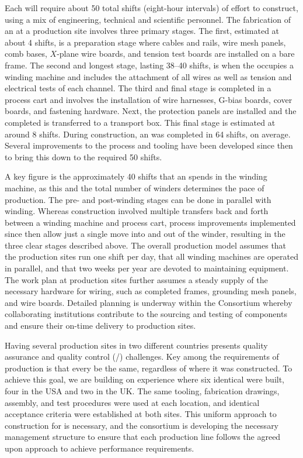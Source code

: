 Each  will require about \num{50} total shifts (eight-hour intervals) of effort to construct, using a mix of engineering, technical and scientific personnel.  The fabrication of an  at a production site involves three primary stages. The first, estimated at about \num{4} shifts, is a preparation stage where  cables and rails, wire mesh panels, comb bases, $X$-plane wire boards, and tension test boards are installed on a bare  frame. The second and longest stage, lasting \num{38}--\num{40} shifts, is when the  occupies a winding machine and includes the attachment of all wires as well as tension and electrical tests of each channel.  The third and final stage is completed in a process cart and involves the installation of wire harnesses, G-bias boards, cover boards, and  fastening hardware.  Next, the protection panels are installed and the completed  is transferred to a transport box. This final stage is estimated at around \num{8} shifts.   During  construction, an  was completed in \num{64} shifts, on average. Several improvements to the process and tooling have been developed since then to bring this down to the required \num{50} shifts. 

A key figure is the approximately \num{40} shifts that an  spends in the winding machine, as this and the total number of winders determines the pace of production. The pre- and post-winding stages can be done in parallel with winding.  Whereas  construction involved multiple transfers back and forth between a winding machine and process cart, process improvements implemented since then allow just a single move into and out of the winder, resulting in the three clear stages described above.  The overall production model assumes that the  production sites run one shift per day, that all winding machines are operated in parallel, and that two weeks per year are devoted to maintaining equipment.  The work plan at production sites further assumes a steady supply of the necessary hardware for  wiring, such as completed frames, grounding mesh panels, and wire boards.  Detailed planning is underway within the   Consortium whereby collaborating institutions contribute to the sourcing and testing of components and ensure their on-time delivery to production sites.        

Having several  production sites in two different countries presents quality assurance and quality control (/) challenges. Key among the requirements of production is that every  be the same, regardless of where it was constructed. To achieve this goal, we are building on  experience where six identical  were built, four in the USA and two in the UK. The same tooling, fabrication drawings, assembly, and test procedures were used at each location, and identical acceptance criteria were established at both sites.  This uniform approach to construction for  is necessary, and the  consortium is developing the necessary management structure to ensure that each production line follows the agreed upon approach to achieve  performance requirements.


